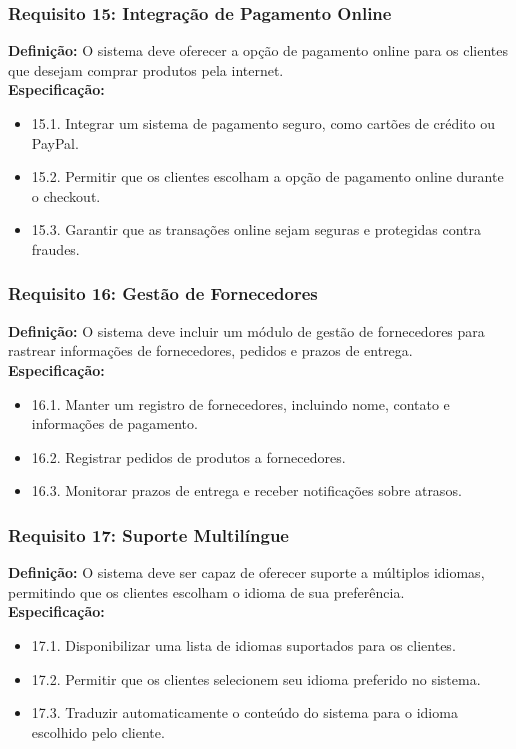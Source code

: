 \subsubsection{Requisito 15: Integração de Pagamento Online}
\textbf{Definição:} O sistema deve oferecer a opção de pagamento online para os clientes que desejam comprar produtos pela internet.
\\
\textbf{Especificação:}
\begin{itemize}
	\item 15.1. Integrar um sistema de pagamento seguro, como cartões de crédito ou PayPal.
	\item 15.2. Permitir que os clientes escolham a opção de pagamento online durante o checkout.
	\item 15.3. Garantir que as transações online sejam seguras e protegidas contra fraudes.
\end{itemize}

\subsubsection{Requisito 16: Gestão de Fornecedores}
\textbf{Definição:} O sistema deve incluir um módulo de gestão de fornecedores para rastrear informações de fornecedores, pedidos e prazos de entrega.
\\
\textbf{Especificação:}
\begin{itemize}
	\item 16.1. Manter um registro de fornecedores, incluindo nome, contato e informações de pagamento.
	\item 16.2. Registrar pedidos de produtos a fornecedores.
	\item 16.3. Monitorar prazos de entrega e receber notificações sobre atrasos.
\end{itemize}

\subsubsection{Requisito 17: Suporte Multilíngue}
\textbf{Definição:} O sistema deve ser capaz de oferecer suporte a múltiplos idiomas, permitindo que os clientes escolham o idioma de sua preferência.
\\
\textbf{Especificação:}
\begin{itemize}
	\item 17.1. Disponibilizar uma lista de idiomas suportados para os clientes.
	\item 17.2. Permitir que os clientes selecionem seu idioma preferido no sistema.
	\item 17.3. Traduzir automaticamente o conteúdo do sistema para o idioma escolhido pelo cliente.
\end{itemize}

